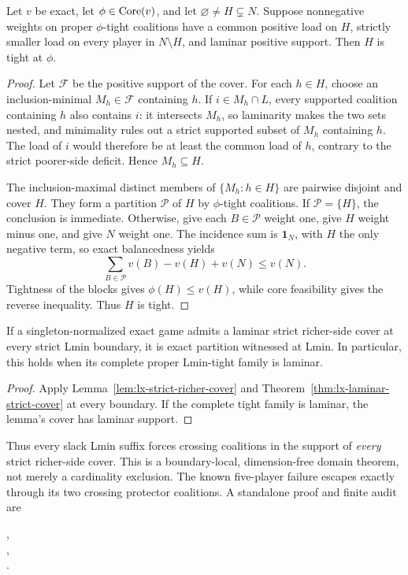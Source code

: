 \begin{theorem}
\label{thm:lx-laminar-strict-cover}
Let $v$ be exact, let $\phi\in\operatorname{Core}(v)$, and let
$\varnothing\ne H\subsetneq N$.  Suppose nonnegative weights on proper
$\phi$-tight coalitions have a common positive load on $H$, strictly smaller
load on every player in $N\setminus H$, and laminar positive support.  Then
$H$ is tight at $\phi$.
\end{theorem}

\begin{proof}
Let $\mathcal F$ be the positive support of the cover.  For each $h\in H$,
choose an inclusion-minimal $M_h\in\mathcal F$ containing $h$.  If
$i\in M_h\cap L$, every supported coalition containing $h$ also contains
$i$: it intersects $M_h$, so laminarity makes the two sets nested, and
minimality rules out a strict supported subset of $M_h$ containing $h$.
The load of $i$ would therefore be at least the common load of $h$, contrary
to the strict poorer-side deficit.  Hence $M_h\subseteq H$.

The inclusion-maximal distinct members of $\{M_h:h\in H\}$ are pairwise
disjoint and cover $H$.  They form a partition $\mathcal P$ of $H$ by
$\phi$-tight coalitions.  If $\mathcal P=\{H\}$, the conclusion is immediate.
Otherwise, give each $B\in\mathcal P$ weight one, give $H$
weight minus one, and give $N$ weight one.  The incidence sum is
$\mathbf1_N$, with $H$ the only negative term, so exact balancedness yields
\[
 \sum_{B\in\mathcal P}v(B)-v(H)+v(N)\leq v(N).
\]
Tightness of the blocks gives $\phi(H)\leq v(H)$, while core feasibility
gives the reverse inequality.  Thus $H$ is tight.
\end{proof}

\begin{corollary}
If a singleton-normalized exact game admits a laminar strict richer-side
cover at every strict Lmin boundary, it is exact partition witnessed at Lmin.
In particular, this holds when its complete proper Lmin-tight family is
laminar.
\end{corollary}

\begin{proof}
Apply Lemma~\ref{lem:lx-strict-richer-cover} and
Theorem~\ref{thm:lx-laminar-strict-cover} at every boundary.  If the complete
tight family is laminar, the lemma's cover has laminar support.
\end{proof}

Thus every slack Lmin suffix forces crossing coalitions in the support of
\emph{every} strict richer-side cover.  This is a boundary-local,
dimension-free domain theorem, not merely a cardinality exclusion.  The
known five-player failure escapes exactly through its two crossing protector
coalitions.  A standalone proof and finite audit are
\begin{center}
\small{},\\[-2pt]
\small{},\\[-2pt]
\small{}.
\end{center}

